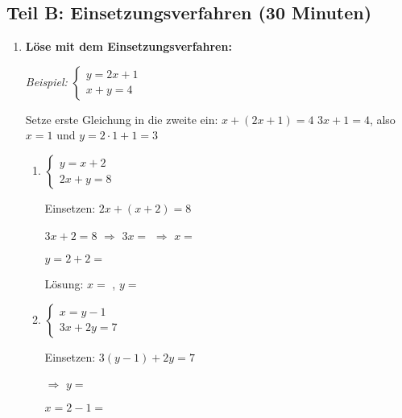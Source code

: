 \subsection*{Teil B: Einsetzungsverfahren (30 Minuten)}

\begin{enumerate}[label=\arabic*., resume]

    \item \textbf{Löse mit dem Einsetzungsverfahren:}
    \vspace{0.5cm}

    \textit{Beispiel:} $\begin{cases} y = 2x + 1 \\ x + y = 4 \end{cases}$

    Setze erste Gleichung in die zweite ein: $x + (2x + 1) = 4$
    $3x + 1 = 4$, also $x = 1$ und $y = 2 \cdot 1 + 1 = 3$

    \begin{enumerate}[label=\alph*)]
        \item $\begin{cases} y = x + 2 \\ 2x + y = 8 \end{cases}$

        Einsetzen: $2x + (x + 2) = 8$

        $3x + 2 = 8$ $\Rightarrow$ $3x =$ \underline{\hspace{1cm}} $\Rightarrow$ $x =$ \underline{\hspace{1cm}}

        $y = 2 + 2 =$ \underline{\hspace{1cm}}

        Lösung: $x =$ \underline{\hspace{1cm}}, $y =$ \underline{\hspace{1cm}}

        \vspace{0.5cm}
        \item $\begin{cases} x = y - 1 \\ 3x + 2y = 7 \end{cases}$

        Einsetzen: $3(y - 1) + 2y = 7$

        \underline{\hspace{8cm}} $\Rightarrow$ $y =$ \underline{\hspace{1cm}}

        $x = 2 - 1 =$ \underline{\hspace{1cm}}


\end{enumerate}
\end{enumerate}
